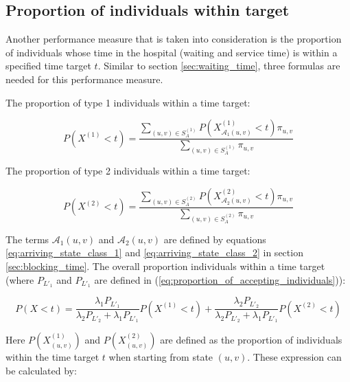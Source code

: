 \subsection{Proportion of individuals within target}\label{sec:proportion_within_target}

Another performance measure that is taken into consideration is the proportion 
of individuals whose time in the hospital (waiting and service time) is within
a specified time target \(t\).
Similar to section \ref{sec:waiting_time}, three formulas are needed for this 
performance measure.

The proportion of type 1 individuals within a time target:

\begin{equation}\label{eq:proportion_within_target_type_1}
    P(X^{(1)} < t) = \frac{\sum_{(u,v) \in S_A^{(1)}} 
    P(X_{\mathcal{A}_1(u,v)}^{(1)} < t) 
    \pi_{u,v} }{\sum_{(u,v) \in S_A^{(1)}} \pi_{u,v}}
\end{equation}

The proportion of type 2 individuals within a time target:

\begin{equation}\label{eq:proportion_within_target_type_2}
    P(X^{(2)} < t) = \frac{\sum_{(u,v) \in S_A^{(2)}} 
    P(X_{\mathcal{A}_2(u,v)}^{(2)} < t) 
    \pi_{u,v} }{\sum_{(u,v) \in S_A^{(2)}} \pi_{u,v}}
\end{equation}

The terms \(\mathcal{A}_1(u,v)\) and \(\mathcal{A}_2(u,v)\) are defined by
equations \ref{eq:arriving_state_class_1} and \ref{eq:arriving_state_class_2}
in section \ref{sec:blocking_time}.
The overall proportion individuals within a time target (where \(P_{L'_1}\) and 
\(P_{L'_1}\) are defined in (\ref{eq:proportion_of_accepting_individuals})):

\begin{equation}\label{eq:overall_proportion_within_target}
    P(X < t) = \frac{\lambda_1 P_{L'_1}}{\lambda_2 P_{L'_2}+\lambda_1 P_{L'_1}} 
    P(X^{(1)} < t) + \frac{\lambda_2 P_{L'_2}}{\lambda_2 P_{L'_2} + 
    \lambda_1 P_{L'_1}} P(X^{(2)} < t) 
\end{equation}

Here \(P(X_{(u,v)}^{(1)})\) and \(P(X_{(u,v)}^{(2)})\) are defined as the
proportion of individuals within the time target \(t\) when starting from state 
\((u,v)\).
These expression can be calculated by:

